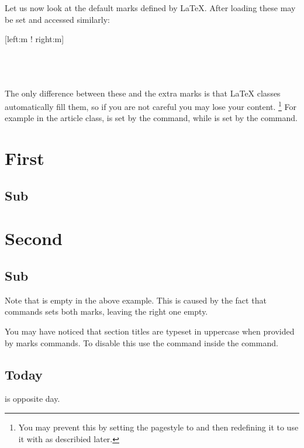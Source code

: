 Let us now look at the default marks defined by \LaTeX{}. After loading
 these may be set and accessed similarly:
\begin{lscommand}
  [left:m ! right:m] \\
   \\
   \\
   \\
\end{lscommand}
The only difference between these and the extra marks is that \LaTeX{} classes
automatically fill them, so if you are not careful you may lose your content.
\footnote{You may prevent this by setting the pagestyle to  
and then redefining it to use it with  as describied later.}
For example in the article class,  is set by the 
command, while  is set by the  command.
\begin{example}[standalone, paperheight=5cm]
\geometry{includehead, includefoot, headsep=.5em, footskip=1em} %
\sloppy %
\usepackage{fancyhdr}%
\usepackage{extramarks}%
\pagestyle{fancy}%
\fancyhead[L]{\firstleftmark}
\fancyhead[R]{\lastleftmark}
\fancyfoot[L]{\firstrightmark}
\fancyfoot[R]{\lastrightmark}

\section{First}
\subsection{Sub}
\section{Second}
\subsection{Sub}
\end{example}
Note that  is empty in the above example. This is caused by
the fact that  commands sets both marks, leaving the right one
empty.

You may have noticed that section titles are typeset in uppercase when provided by
marks commands. To disable this use the  command inside the 
command.
\begin{example}[standalone, paperheight=3cm]
\geometry{includehead, includefoot, headsep=.5em, footskip=1em} %
\sloppy %
\usepackage{fancyhdr}%
\usepackage{extramarks}%
\pagestyle{fancy}%
\fancyhead[R]{\nouppercase{\firstleftmark}}

\section{Today}
is opposite day.
\end{example}

